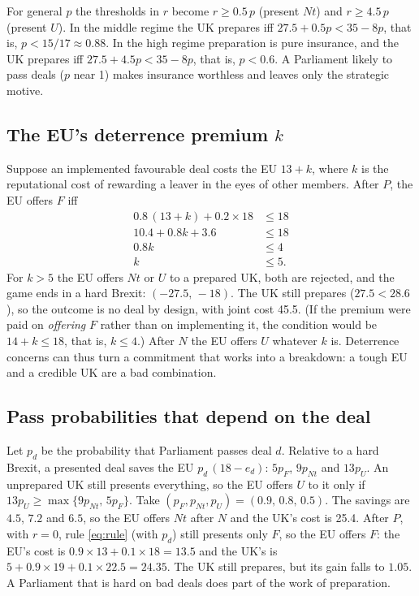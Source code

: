 \documentclass[11pt,a4paper]{article}
\newcommand{\Nt}{\mathit{Nt}}
\newcommand{\dF}{\mathit{F}}
\newcommand{\dU}{\mathit{U}}
\begin{document}
For general $p$ the thresholds in $r$ become $r\ge0.5\,p$ (present $\Nt$) and $r\ge4.5\,p$
(present $\dU$). In the middle regime the UK prepares iff $27.5+0.5p<35-8p$, that is,
$p<15/17\approx0.88$. In the high regime preparation is pure insurance, and the UK
prepares iff $27.5+4.5p<35-8p$, that is, $p<0.6$. A Parliament likely to pass deals ($p$ near 1)
makes insurance worthless and leaves only the strategic motive.

\subsection{\texorpdfstring{The EU's deterrence premium $k$}{The EU's deterrence premium k}}

Suppose an implemented favourable deal costs the EU $13+k$, where $k$ is the reputational cost of
rewarding a leaver in the eyes of other members. After $P$, the EU offers $\dF$ iff
\begin{align*}
  0.8\,(13+k)+0.2\times18 &\le 18\\
  10.4+0.8k+3.6 &\le 18\\
  0.8k &\le 4\\
  k &\le 5 .
\end{align*}
For $k>5$ the EU offers $\Nt$ or $\dU$ to a prepared UK, both are rejected, and the game ends in a
hard Brexit: $(-27.5,\,-18)$. The UK still prepares ($27.5<28.6$), so the outcome is no deal by
design, with joint cost 45.5. (If the premium were paid on \emph{offering} $\dF$ rather than on
implementing it, the condition would be $14+k\le18$, that is, $k\le4$.) After $N$ the EU offers
$\dU$ whatever $k$ is. Deterrence concerns can thus turn a commitment that works into a breakdown: a
tough EU and a credible UK are a bad combination.

\subsection{Pass probabilities that depend on the deal}

Let $p_d$ be the probability that Parliament passes deal $d$. Relative to a hard Brexit, a presented deal
saves the EU $p_d\,(18-e_d)$: $5p_{\dF}$, $9p_{\Nt}$ and $13p_{\dU}$. An unprepared UK still presents
everything, so the EU offers $\dU$ to it only if $13p_{\dU}\ge\max\{9p_{\Nt},\,5p_{\dF}\}$. Take
$(p_{\dF},p_{\Nt},p_{\dU})=(0.9,\,0.8,\,0.5)$. The savings are $4.5$, $7.2$ and $6.5$, so the EU offers
$\Nt$ after $N$ and the UK's cost is 25.4. After $P$, with $r=0$, rule \eqref{eq:rule} (with $p_d$) still
presents only $\dF$, so the EU offers $\dF$: the EU's cost is $0.9\times13+0.1\times18=13.5$ and the UK's is
$5+0.9\times19+0.1\times22.5=24.35$. The UK still prepares, but its gain falls to $1.05$. A
Parliament that is hard on bad deals does part of the work of preparation.
\end{document}
